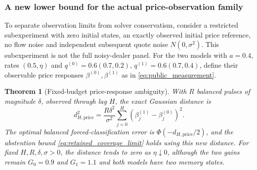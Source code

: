 \documentclass[10pt,twocolumn,letterpaper]{article}
\newtheorem{theorem}{Theorem}[section]
\theoremstyle{definition}
\theoremstyle{remark}
\begin{document}
\subsubsection{A new lower bound for the actual price-observation family}
\label{subsec:price_limit}
To separate observation limits from solver conservatism, consider a restricted subexperiment with zero initial states, an exactly observed initial price reference, no flow noise and independent subsequent quote noise $N(0,\sigma^2)$. This subexperiment is not the full noisy-dealer panel. For the two models with $a=0.4$, rates $(0.5,\eta)$ and $q^{(0)}=0.6(0.7,0.2)$, $q^{(1)}=0.6(0.7,0.4)$, define their observable price responses $\beta^{(0)},\beta^{(1)}$ as in \eqref{eq:public_measurement}.

\begin{theorem}[Fixed-budget price-response ambiguity]
\label{thm:price_limit}
With $R$ balanced pulses of magnitude $\delta$, observed through lag $H$, the exact Gaussian distance is
\begin{equation}
 d_{H,\mathrm{price}}^2=\frac{R\delta^2}{\sigma^2}
 \sum_{j=0}^{H}(\beta_j^{(1)}-\beta_j^{(0)})^2.
 \label{eq:price_distance}
\end{equation}
The optimal balanced forced-classification error is $\Phi(-d_{H,\mathrm{price}}/2)$, and the abstention bound \eqref{eq:retained_coverage_limit} holds using this new distance. For fixed $H,R,\delta,\sigma>0$, the distance tends to zero as $\eta\downarrow0$, although the two gains remain $G_0=0.9$ and $G_1=1.1$ and both models have two memory states.
\end{theorem}
\end{document}
